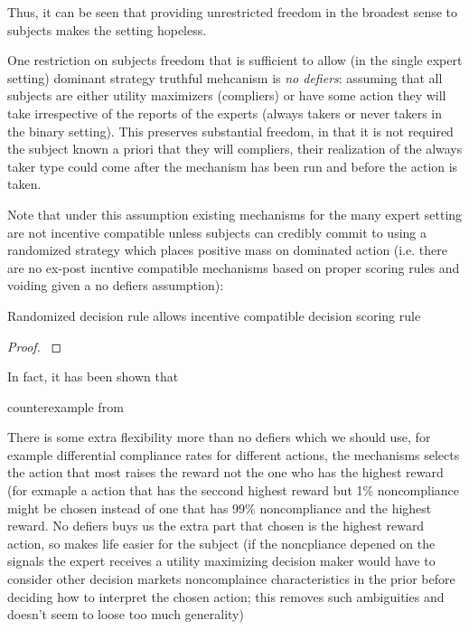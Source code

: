 Thus, it can be seen that providing unrestricted freedom in the broadest sense to subjects makes the setting hopeless. 

One restriction on subjects freedom that is sufficient to allow (in the single expert setting) dominant strategy truthful mehcanism is \emph{no defiers}: assuming that all subjects are either utility maximizers (compliers) or have some action they will take irrespective of the reports of the experts (always takers or never takers in the binary setting).
This preserves substantial freedom, in that it is not required the subject known a priori that they will compliers, their realization of the always taker type could come after the mechanism has been run and before the action is taken. 

Note that under this assumption existing mechanisms for the many expert setting are not incentive compatible unless subjects can credibly commit to using a randomized strategy which places positive mass on dominated action (i.e. there are no ex-post incntive compatible mechanisms based on proper scoring rules and voiding given a no defiers assumption):

\begin{thm}
	Randomized decision rule allows incentive compatible decision scoring rule
\end{thm}

\begin{proof}
	\cite{chen2014eliciting}
\end{proof}

In fact, it has been shown that

\begin{eg}
	counterexample from \cite{chen2014eliciting}
\end{eg}


There is some extra flexibility more than no defiers which we should use, for example differential compliance rates for different actions, the mechanisms selects the action that most raises the reward not the one who has the highest reward (for exmaple a action that has the seccond highest reward but 1\% noncompliance might be chosen instead of one  that has 99\% noncompliance and the highest reward. No defiers buys us the extra part that chosen is the highest reward action, so makes life easier for the subject (if the noncpliance depened on the signals the expert receives a utility maximizing decision maker would have to consider other decision markets noncomplaince characteristics in the prior before deciding how to interpret the chosen action; this removes such ambiguities and doesn't seem to loose too much generality)



